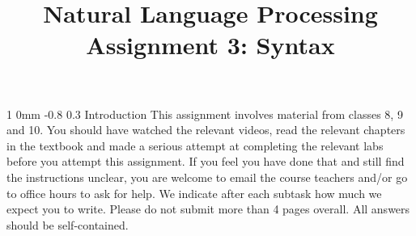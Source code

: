 \documentclass[11pt]{article}
\title{{\LARGE Natural Language Processing}\\[1.5mm]{\large Assignment 3: Syntax}}
\author{}
\date{} %
\makeatletter
\renewcommand{\section}{\@startsection
{section}%
{1}%
{0mm}%
{-0.8\baselineskip}%
{0.3\baselineskip}%
{\bfseries\large}}%
\makeatother
\begin{document}
 

\maketitle
\noindent
\section{Introduction}
\noindent This assignment involves material from classes 8, 9 and
10. You should have watched the relevant videos, read the relevant
chapters in the textbook and made a serious attempt at completing the
relevant labs before you attempt this assignment. If you feel you have
done that and still find the instructions unclear, you are welcome to
email the course teachers and/or go to office hours to ask for help.
We indicate after each subtask how much we expect you to write. 
Please do not submit more than 4 pages overall.  All answers 
should be self-contained.
\end{document}
